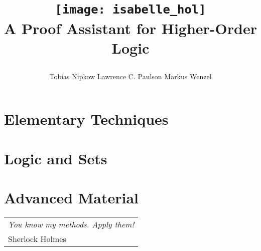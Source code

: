 \documentclass{article}
\begin{document}
\title{
\begin{center}
\texttt{[image: isabelle\_hol]}
       \\ \vspace{0.5cm} A Proof Assistant for Higher-Order Logic
\end{center}}
\author{Tobias Nipkow \quad Lawrence C. Paulson \quad Markus Wenzel%
}
\maketitle

\setcounter{page}{5}


\tableofcontents

\cleardoublepage{}

\part{Elementary Techniques}




\part{Logic and Sets}




\part{Advanced Material}




\markboth{}{}
\cleardoublepage
\vspace*{\fill}
\begin{flushright}
\begin{tabular}{l}
{\large\sf\slshape You know my methods. Apply them!}\\[1ex]
Sherlock Holmes
\end{tabular}
\end{flushright}
\vspace*{\fill}
\vspace*{\fill}

\underscoreoff





\underscoreoff
\printindex
\end{document}

